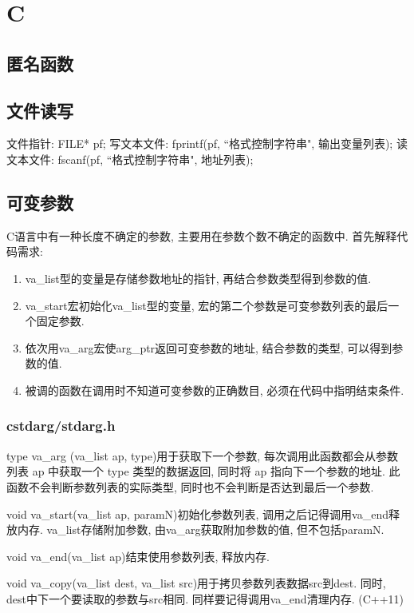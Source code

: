 \chapter{C}
\section{匿名函数}


\section{文件读写}
文件指针: FILE* pf; 写文本文件: fprintf(pf, ``格式控制字符串", 输出变量列表);
读文本文件: fscanf(pf, ``格式控制字符串", 地址列表);

\section{可变参数}
C语言中有一种长度不确定的参数, 主要用在参数个数不确定的函数中. 首先解释代码需求:

\begin{enumerate}[(1)]
\item va\_list型的变量是存储参数地址的指针, 再结合参数类型得到参数的值.
\item va\_start宏初始化va\_list型的变量, 宏的第二个参数是可变参数列表的最后一个固定参数.
\item 依次用va\_arg宏使arg\_ptr返回可变参数的地址, 结合参数的类型, 可以得到参数的值.
\item 被调的函数在调用时不知道可变参数的正确数目, 必须在代码中指明结束条件.
\end{enumerate}


\subsection{cstdarg/stdarg.h}
type va\_arg (va\_list ap, type)用于获取下一个参数, 每次调用此函数都会从参数列表 ap 中获取一个 type 类型的数据返回, 
同时将 ap 指向下一个参数的地址. 此函数不会判断参数列表的实际类型, 同时也不会判断是否达到最后一个参数.

void va\_start(va\_list ap, paramN)初始化参数列表, 调用之后记得调用va\_end释放内存. va\_list存储附加参数, 
由va\_arg获取附加参数的值, 但不包括paramN.

void va\_end(va\_list ap)结束使用参数列表, 释放内存.

void va\_copy(va\_list dest, va\_list src)用于拷贝参数列表数据src到dest. 同时,
dest中下一个要读取的参数与src相同. 同样要记得调用va\_end清理内存. (C++11)
